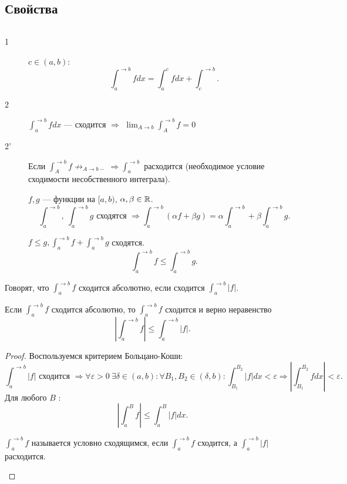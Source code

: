 % 
% 

\subsection{Свойства}
\begin{prop}
    $ $
    \begin{description}
	\item[1] $ c \in  (a, b)$:
	    \[
		\int_{a }^{ \to b}  f dx = \int_{ a }^{c} f dx + \int_{ c}^{ \to b}
	    .\]
	\item [2]$ \int_{a}^{ \to  b} f dx $ --- сходится $ \Longrightarrow $ $ \lim_{A \to  b} \int_{A}^{ \to b} f = 0 $
\item[2'] Если $ \int_{A}^{ \to b} f \not\to_{A \to b-} \Longrightarrow  \int_{a}^{ \to b}  $ расходится (необходимое условие сходимости несобственного интеграла).
\item [] $ f, g$ --- функции на $ [a, b)$,  $ \alpha , \beta  \in \mathbb{R}$.
    \[
	\int_{a}^{  \to b} , ~ \int_{a}^{ \to  b}  g  \text{ сходятся } \Longrightarrow \int_{a}^{\to b} ( \alpha  f + \beta  g)  = \alpha \int_{ a}^{ \to b}      + \beta  \int_{a}^{ \to  b}  g
    .\]
\item  []
    $ f \le  g,  \int_{ a}^{ \to b} f + \int_{a}^{ \to b} g   $ сходятся. \[
	\int_{ a}^{ \to  b} f \le  \int_{ a}^{ \to b}  g
    .\]
    \end{description}
    \begin{defn}
	Говорят, что $ \int_{a}^{\to b} f  $ {\sf   сходится абсолютно}, если сходится $ \int_{a}^{ \to b} |f|  $.
    \end{defn}
    Если $ \int_{a}^{ \to  b} f $ сходится абсолютно, то $ \int_{a}^{ \to  b} f $ сходится и верно неравенство
    \[
	\left| \int_{a}^{ \to b}  f  \right| \le  \int_a ^{ \to b}\left| f  \right|
    .\]
    \begin{proof}
	Воспользуемся критерием Больцано-Коши:
	\[
	    \int_{ a}^{ \to  b} |f| \text{  сходится } \Longrightarrow  \forall  \varepsilon  >0 ~ \exists \delta \in  (a, b): \forall B_1, B_2 \in (\delta,  b): \int_{B_1}^{B_2}  |f| dx < \varepsilon  \Longrightarrow \left| \int_{B_1}^{B_2} f dx  \right| < \varepsilon
	.\]
	Для любого $ B$ :
	\[
	    \left|  \int_{ a}^{B} f   \right| \le  \int_{a}^{ B} |f|dx
	.\]
	\begin{defn}
	    $ \int_{a}^{ \to  b} f  $ называется {\sf   условно сходящимся}, если $ \int_{a}^{ \to b} f $ сходится, а $ \int_{a}^{ \to b} |f| $ расходится.
	\end{defn}


\end{proof}
\end{prop}
